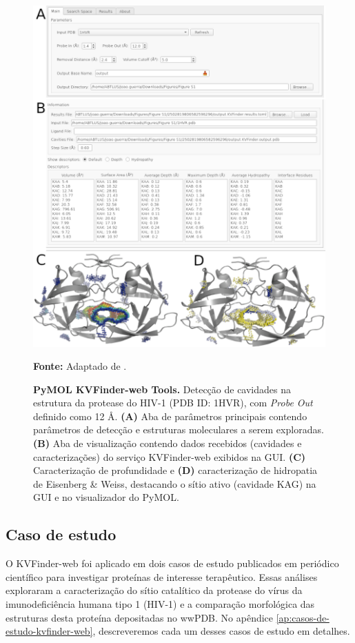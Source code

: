 \documentclass[Portugues]{phdquali}
\begin{document}
\begin{figure}[H]
  \centering
  \includegraphics[scale=2.5]{images/pymol-kvweb-tools.png}
  \centerline{\scriptsize{\textbf{Fonte:} Adaptado de \cite{guerra2023A}.}}
  \caption[PyMOL KVFinder-web Tools]{\textbf{PyMOL KVFinder-web Tools.} Detecção de cavidades na estrutura da protease do HIV-1 (PDB ID: 1HVR), com \textit{Probe Out} definido como 12 Å. \textbf{(A)} Aba de parâmetros principais contendo parâmetros de detecção e estruturas moleculares a serem exploradas. \textbf{(B)} Aba de visualização contendo dados recebidos (cavidades e caracterizações) do serviço KVFinder-web exibidos na GUI. \textbf{(C)} Caracterização de profundidade e \textbf{(D)} caracterização de hidropatia de Eisenberg & Weiss, destacando o sítio ativo (cavidade KAG) na GUI e no visualizador do PyMOL.}
  \label{fig:pymol-kvweb-tools}
\end{figure}

\subsection{Caso de estudo}

O KVFinder-web foi aplicado em dois casos de estudo publicados em periódico científico para investigar proteínas de interesse terapêutico. Essas análises exploraram a caracterização do sítio catalítico da protease do vírus da imunodeficiência humana tipo 1 (HIV-1) e a comparação morfológica das estruturas desta proteína depositadas no wwPDB. No apêndice \ref{ap:casos-de-estudo-kvfinder-web}, descreveremos cada um desses casos de estudo em detalhes.
\end{document}
